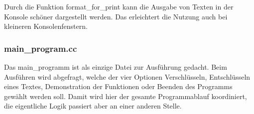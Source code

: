 \documentclass[ngerman,12pt]{article}
\begin{document}
Durch die Funktion format\_for\_print kann die Ausgabe von Texten in der Konsole schöner dargestellt werden. Das erleichtert die Nutzung auch bei kleineren Konsolenfenstern.

\subsubsection*{main\_program.cc}

Das main\_programm ist als einzige Datei zur Ausführung gedacht. Beim Ausführen wird abgefragt, welche der vier Optionen Verschlüsseln, Entschlüsseln eines Textes, Demonstration der Funktionen oder Beenden des Programms gewählt werden soll. Damit wird hier der gesamte Programmablauf koordiniert, die eigentliche Logik passiert aber an einer anderen Stelle.

\newpage
\listoftables
\printbibliography
\end{document}
